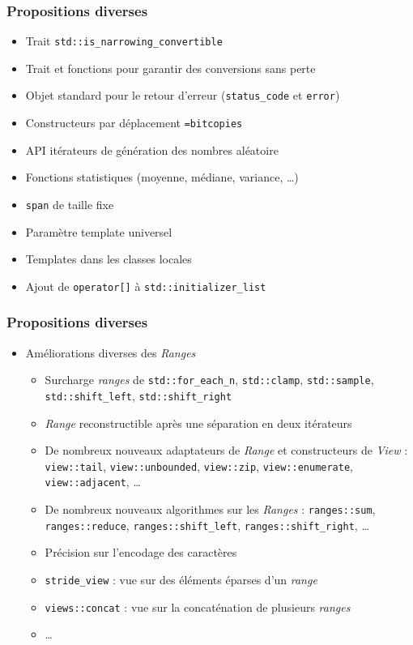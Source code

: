 \documentclass[C++.tex]{subfiles}
\begin{document}
\begin{frame}[fragile]
	\frametitle{Propositions diverses}
	\begin{itemize}
		\item Trait \lstinline|std::is_narrowing_convertible|
		\item Trait et fonctions pour garantir des conversions sans perte
		\item Objet standard pour le retour d'erreur (\lstinline|status_code| et \lstinline|error|)
		\item Constructeurs par déplacement \lstinline|=bitcopies|
		\item API \og itérateurs\fg{} de génération des nombres aléatoire
		\item Fonctions statistiques (moyenne, médiane, variance, \ldots)
		\item \lstinline|span| de taille fixe
		\item Paramètre template universel


		\item Templates dans les classes locales
		\item Ajout de \lstinline|operator[]| à \lstinline|std::initializer_list|
	\end{itemize}
\end{frame}

\begin{frame}[fragile]
	\frametitle{Propositions diverses}
	\begin{itemize}
		\item Améliorations diverses des \textit{Ranges}
		\begin{itemize}
			\item Surcharge \textit{ranges} de \lstinline|std::for_each_n|, \lstinline|std::clamp|, \lstinline|std::sample|, \lstinline|std::shift_left|, \lstinline|std::shift_right|
			\item \textit{Range} reconstructible après une séparation en deux itérateurs
			\item De nombreux nouveaux adaptateurs de \textit{Range} et constructeurs de \textit{View} : \lstinline|view::tail|, \lstinline|view::unbounded|, \lstinline|view::zip|, \lstinline|view::enumerate|, \lstinline|view::adjacent|, \ldots
			\item De nombreux nouveaux algorithmes sur les \textit{Ranges} : \lstinline|ranges::sum|, \lstinline|ranges::reduce|, \lstinline|ranges::shift_left|, \lstinline|ranges::shift_right|, \ldots
			\item Précision sur l'encodage des caractères 
			\item \lstinline|stride_view| : vue sur des éléments éparses d'un \textit{range}
			\item \lstinline|views::concat| : vue sur la concaténation de plusieurs \textit{ranges}
			\item \ldots
		\end{itemize}
	\end{itemize}
\end{frame}
\end{document}
